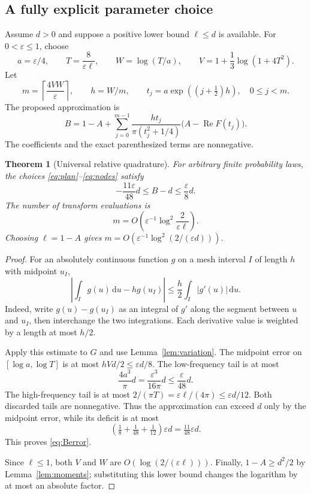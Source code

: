 \documentclass[11pt]{article}
\newtheorem{theorem}{Theorem}[section]
\theoremstyle{definition}
\theoremstyle{remark}
\DeclareMathOperator{\Rea}{Re}
\newcommand{\eps}{\varepsilon}
\newcommand{\dd}{\,\mathrm d}
\begin{document}
\subsection{A fully explicit parameter choice}

Assume $d>0$ and suppose a positive lower bound $\ell\le d$ is available. For $0<\eps\le1$, choose
\begin{equation}
 a=\eps/4,\qquad T=\frac8{\eps\ell},\qquad
 W=\log(T/a),\qquad V=1+\frac13\log(1+4T^2).
 \label{eq:plan}
\end{equation}
Let
\begin{equation}
 m=\left\lceil\frac{4VW}{\eps}\right\rceil,\qquad
 h=W/m,\qquad t_j=a\exp((j+\tfrac12)h),\quad 0\le j<m.
 \label{eq:nodes}
\end{equation}
The proposed approximation is
\begin{equation}
 B=1-A+\sum_{j=0}^{m-1}
       \frac{h t_j}{\pi(t_j^2+1/4)}\bigl(A-\Rea F(t_j)\bigr).
 \label{eq:B}
\end{equation}
The coefficients and the exact parenthesized terms are nonnegative.

\begin{theorem}[Universal relative quadrature]
\label{thm:quadrature}
For arbitrary finite probability laws, the choices \eqref{eq:plan}--\eqref{eq:nodes} satisfy
\begin{equation}
 -\frac{11\eps}{48}d\le B-d\le\frac{\eps}{8}d.
 \label{eq:Berror}
\end{equation}
The number of transform evaluations is
\begin{equation}
 m=O\!\left(\eps^{-1}\log^2\frac{2}{\eps\ell}\right).
 \label{eq:oraclem}
\end{equation}
Choosing $\ell=1-A$ gives
$m=O(\eps^{-1}\log^2(2/(\eps d)))$.
\end{theorem}
\begin{proof}
For an absolutely continuous function $g$ on a mesh interval $I$ of length $h$ with midpoint $u_I$,
\[
 \left|\int_I g(u)\dd u-hg(u_I)\right|
 \le\frac h2\int_I|g'(u)|\dd u.
\]
Indeed, write $g(u)-g(u_I)$ as an integral of $g'$ along the segment between $u$ and $u_I$, then interchange the two integrations. Each derivative value is weighted by a length at most $h/2$.

Apply this estimate to $G$ and use Lemma~\ref{lem:variation}. The midpoint error on $[\log a,\log T]$ is at most $hVd/2\le\eps d/8$. The low-frequency tail is at most
\[
 \frac{4a^3}{\pi}d=\frac{\eps^3}{16\pi}d\le\frac{\eps}{48}d.
\]
The high-frequency tail is at most
$2/(\pi T)=\eps\ell/(4\pi)\le\eps d/12$.
Both discarded tails are nonnegative. Thus the approximation can exceed $d$ only by the midpoint error, while its deficit is at most
\[
 (\tfrac18+\tfrac1{48}+\tfrac1{12})\eps d
 =\tfrac{11}{48}\eps d.
\]
This proves \eqref{eq:Berror}.

Since $\ell\le1$, both $V$ and $W$ are $O(\log(2/(\eps\ell)))$. Finally, $1-A\ge d^2/2$ by Lemma~\ref{lem:moments}; substituting this lower bound changes the logarithm by at most an absolute factor.
\end{proof}
\end{document}
